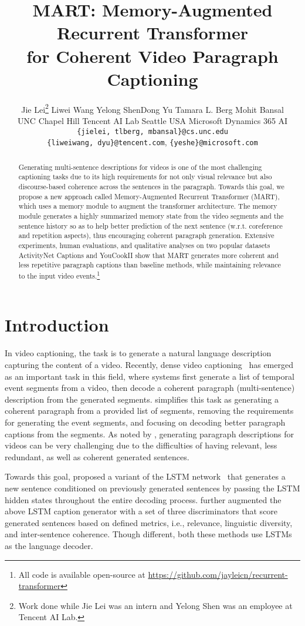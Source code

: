 \documentclass[11pt,a4paper]{article}
\title{MART: Memory-Augmented Recurrent Transformer \\ for Coherent Video Paragraph Captioning}
\author{Jie Lei\thanks{\quad Work done while Jie Lei was an intern and Yelong Shen was an employee at Tencent AI Lab.} \quad Liwei Wang \quad Yelong Shen\footnotemark[1] \quad Dong Yu \quad Tamara L. Berg \quad Mohit Bansal \\ 
  UNC Chapel Hill \quad Tencent AI Lab Seattle USA \quad Microsoft Dynamics 365 AI \\ 
  \texttt{\{jielei, tlberg, mbansal\}@cs.unc.edu} \\
  \texttt{\{liweiwang, dyu\}@tencent.com}, \texttt{\{yeshe\}@microsoft.com}
  }
\begin{document}
\maketitle
\begin{abstract}
Generating multi-sentence descriptions for videos is one of the most challenging captioning tasks due to its high requirements for not only visual relevance but also discourse-based coherence across the sentences in the paragraph. 
Towards this goal, we propose a new approach called Memory-Augmented Recurrent Transformer (MART), which uses a memory module to augment the transformer architecture. 
The memory module generates a highly summarized memory state from the video segments and the sentence history so as to help better prediction of the next sentence (w.r.t. coreference and repetition aspects), thus encouraging coherent paragraph generation. 
Extensive experiments, human evaluations, and qualitative analyses on two popular datasets ActivityNet Captions and YouCookII show that MART generates more coherent and less repetitive paragraph captions than baseline methods, while maintaining relevance to the input video events.\footnote{All code is available open-source at \url{https://github.com/jayleicn/recurrent-transformer}}
\end{abstract}



\section{Introduction}\label{introuction}
In video captioning, the task is to generate a natural language description capturing the content of a video. Recently, dense video captioning~\cite{krishna2017dense} has emerged as an important task in this field, where systems first generate a list of temporal event segments from a video, then decode a coherent paragraph (multi-sentence) description from the generated segments. \citet{park2019adversarial} simplifies this task as generating a coherent paragraph from a provided list of segments, removing the requirements for generating the event segments, and focusing on decoding better paragraph captions from the segments.
As noted by \citet{Xiong2018MoveFA,park2019adversarial}, generating paragraph descriptions for videos can be very challenging due to the difficulties of having relevant, less redundant, as well as coherent generated sentences. 

Towards this goal, \citet{Xiong2018MoveFA} proposed a variant of the LSTM network~\cite{hochreiter1997long} that generates a new sentence conditioned on previously generated sentences by passing the LSTM hidden states throughout the entire decoding process. 
\citet{park2019adversarial} further augmented the above LSTM caption generator with a set of three discriminators that score generated sentences based on defined metrics, i.e., relevance, linguistic diversity, and inter-sentence coherence. Though different, both these methods use LSTMs as the language decoder. 
\end{document}
